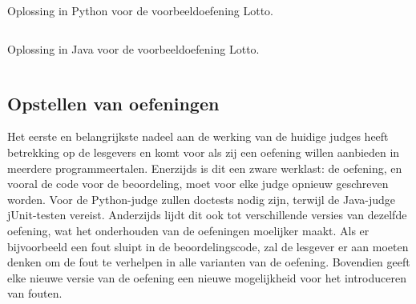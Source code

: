 \begin{quote}
\end{quote}

\begin{listing}
    \caption{Oplossing in Python voor de voorbeeldoefening Lotto.}
    \label{lst:python-solution}
    \inputminted{python3}{sources/lotto-correct.py}
\end{listing}

\begin{listing}
    \caption{Oplossing in Java voor de voorbeeldoefening Lotto.}
    \label{lst:java-solution}
    \inputminted{java}{sources/lotto-correct.java}
\end{listing}

\subsection{Opstellen van oefeningen}\label{subsec:opstellen-van-oefeningen}

Het eerste en belangrijkste nadeel aan de werking van de huidige judges heeft betrekking op de lesgevers en komt voor als zij een oefening willen aanbieden in meerdere programmeertalen.
Enerzijds is dit een zware werklast: de oefening, en vooral de code voor de beoordeling, moet voor elke judge opnieuw geschreven worden.
Voor de Python-judge zullen doctests nodig zijn, terwijl de Java-judge jUnit-testen vereist.
Anderzijds lijdt dit ook tot verschillende versies van dezelfde oefening, wat het onderhouden van de oefeningen moelijker maakt.
Als er bijvoorbeeld een fout sluipt in de beoordelingscode, zal de lesgever er aan moeten denken om de fout te verhelpen in alle varianten van de oefening.
Bovendien geeft elke nieuwe versie van de oefening een nieuwe mogelijkheid voor het introduceren van fouten.

